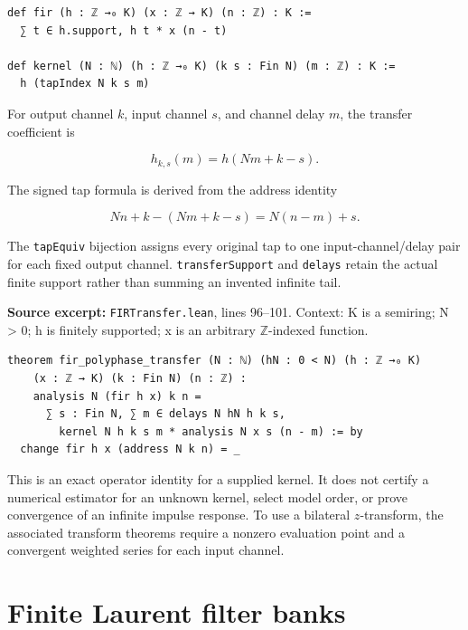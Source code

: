 \documentclass[11pt]{article}
\begin{document}
\begin{minipage}{\linewidth}
\begin{lstlisting}
def fir (h : ℤ →₀ K) (x : ℤ → K) (n : ℤ) : K :=
  ∑ t ∈ h.support, h t * x (n - t)

def kernel (N : ℕ) (h : ℤ →₀ K) (k s : Fin N) (m : ℤ) : K :=
  h (tapIndex N k s m)
\end{lstlisting}
\end{minipage}\par

For output channel \(k\), input channel \(s\), and channel delay \(m\), the transfer coefficient is

\[h_{k,s}(m)=h(Nm+k-s).\]

The signed tap formula is derived from the address identity

\[Nn+k-(Nm+k-s)=N(n-m)+s.\]

The \texttt{tapEquiv} bijection assigns every original tap to one input-channel/delay pair for each fixed output channel. \texttt{transferSupport} and \texttt{delays} retain the actual finite support rather than summing an invented infinite tail.

\textbf{Source excerpt:} \texttt{FIRTransfer.lean}, lines 96--101. Context: K is a semiring; N \textgreater{} 0; h is finitely supported; x is an arbitrary \ensuremath{\mathbb Z}-indexed function.

\begin{minipage}{\linewidth}
\begin{lstlisting}
theorem fir_polyphase_transfer (N : ℕ) (hN : 0 < N) (h : ℤ →₀ K)
    (x : ℤ → K) (k : Fin N) (n : ℤ) :
    analysis N (fir h x) k n =
      ∑ s : Fin N, ∑ m ∈ delays N hN h k s,
        kernel N h k s m * analysis N x s (n - m) := by
  change fir h x (address N k n) = _
\end{lstlisting}
\end{minipage}\par

This is an exact operator identity for a supplied kernel. It does not certify a numerical estimator for an unknown kernel, select model order, or prove convergence of an infinite impulse response. To use a bilateral \(z\)-transform, the associated transform theorems require a nonzero evaluation point and a convergent weighted series for each input channel.

\hypertarget{finite-laurent-filter-banks}{%
\section{Finite Laurent filter banks}\label{finite-laurent-filter-banks}}
\end{document}
